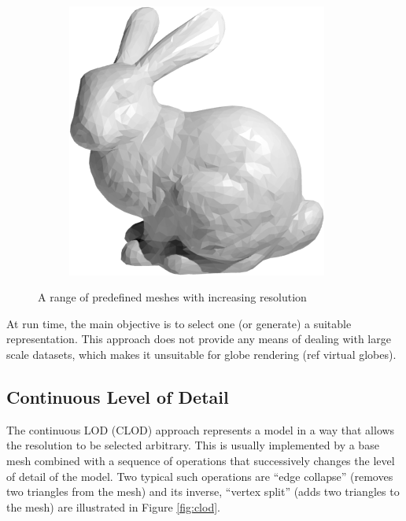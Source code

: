 \begin{figure}
\begin{subfigure}[b]{0.2\textwidth}
    \end{subfigure}
    ~ %
    \begin{subfigure}[b]{0.2\textwidth}
        \includegraphics[width=\textwidth]{figures/lod/decimation1.png}
    \end{subfigure}
    \caption{A range of predefined meshes with increasing resolution}
    \label{fig:dlod}
\end{figure}

At run time, the main objective is to select one (or generate) a suitable representation. This approach does not provide any means of dealing with large scale datasets, which makes it unsuitable for globe rendering (ref virtual globes).


\subsection{Continuous Level of Detail}
The continuous LOD (CLOD) approach represents a model in a way that allows the resolution to be selected arbitrary. This is usually implemented by a base mesh combined with a sequence of operations that successively changes the level of detail of the model. Two typical such operations are ``edge collapse'' (removes two triangles from the mesh) and its inverse, ``vertex split'' (adds two triangles to the mesh) are illustrated in Figure \ref{fig:clod}.

